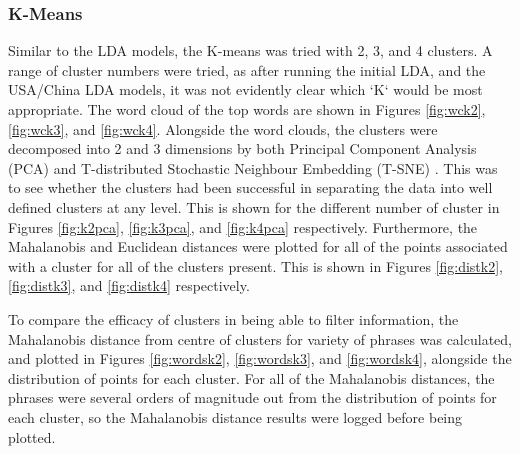 \subsubsection{K-Means}
Similar to the LDA models, the K-means was tried with 2, 3, and 4 clusters. A range of cluster numbers were tried, as after running the initial LDA, and the USA/China LDA models, it was not evidently clear which `K` would be most appropriate. The word cloud of the top words are shown in Figures \ref{fig:wck2}, \ref{fig:wck3}, and \ref{fig:wck4}. Alongside the word clouds, the clusters were decomposed into 2 and 3 dimensions by both Principal Component Analysis (PCA) and T-distributed Stochastic Neighbour Embedding (T-SNE) \cite{maaten2008visualizing}. This was to see whether the clusters had been successful in separating the data into well defined clusters at any level. This is shown for the different number of cluster in Figures \ref{fig:k2pca}, \ref{fig:k3pca}, and \ref{fig:k4pca} respectively. Furthermore, the Mahalanobis and Euclidean distances were plotted for all of the points associated with a cluster for all of the clusters present. This is shown in Figures \ref{fig:distk2}, \ref{fig:distk3}, and \ref{fig:distk4} respectively. 

To compare the efficacy of clusters in being able to filter information, the Mahalanobis distance from centre of clusters for variety of phrases was calculated, and plotted in Figures \ref{fig:wordsk2}, \ref{fig:wordsk3}, and \ref{fig:wordsk4}, alongside the distribution of points for each cluster. For all of the Mahalanobis distances, the phrases were several orders of magnitude out from the distribution of points for each cluster, so the Mahalanobis distance results were logged before being plotted.  
